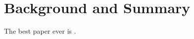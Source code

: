 \section{Background and Summary}
\label{sec:background}



The best paper ever is \cite{singleton2021geographic}.


